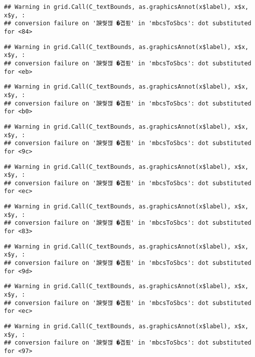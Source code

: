 \documentclass[
]{article}
\begin{document}
\begin{verbatim}
## Warning in grid.Call(C_textBounds, as.graphicsAnnot(x$label), x$x, x$y, :
## conversion failure on '諛쒖깮 �곕룄' in 'mbcsToSbcs': dot substituted for <84>
\end{verbatim}

\begin{verbatim}
## Warning in grid.Call(C_textBounds, as.graphicsAnnot(x$label), x$x, x$y, :
## conversion failure on '諛쒖깮 �곕룄' in 'mbcsToSbcs': dot substituted for <eb>
\end{verbatim}

\begin{verbatim}
## Warning in grid.Call(C_textBounds, as.graphicsAnnot(x$label), x$x, x$y, :
## conversion failure on '諛쒖깮 �곕룄' in 'mbcsToSbcs': dot substituted for <b0>
\end{verbatim}

\begin{verbatim}
## Warning in grid.Call(C_textBounds, as.graphicsAnnot(x$label), x$x, x$y, :
## conversion failure on '諛쒖깮 �곕룄' in 'mbcsToSbcs': dot substituted for <9c>
\end{verbatim}

\begin{verbatim}
## Warning in grid.Call(C_textBounds, as.graphicsAnnot(x$label), x$x, x$y, :
## conversion failure on '諛쒖깮 �곕룄' in 'mbcsToSbcs': dot substituted for <ec>
\end{verbatim}

\begin{verbatim}
## Warning in grid.Call(C_textBounds, as.graphicsAnnot(x$label), x$x, x$y, :
## conversion failure on '諛쒖깮 �곕룄' in 'mbcsToSbcs': dot substituted for <83>
\end{verbatim}

\begin{verbatim}
## Warning in grid.Call(C_textBounds, as.graphicsAnnot(x$label), x$x, x$y, :
## conversion failure on '諛쒖깮 �곕룄' in 'mbcsToSbcs': dot substituted for <9d>
\end{verbatim}

\begin{verbatim}
## Warning in grid.Call(C_textBounds, as.graphicsAnnot(x$label), x$x, x$y, :
## conversion failure on '諛쒖깮 �곕룄' in 'mbcsToSbcs': dot substituted for <ec>
\end{verbatim}

\begin{verbatim}
## Warning in grid.Call(C_textBounds, as.graphicsAnnot(x$label), x$x, x$y, :
## conversion failure on '諛쒖깮 �곕룄' in 'mbcsToSbcs': dot substituted for <97>
\end{verbatim}
\end{document}
